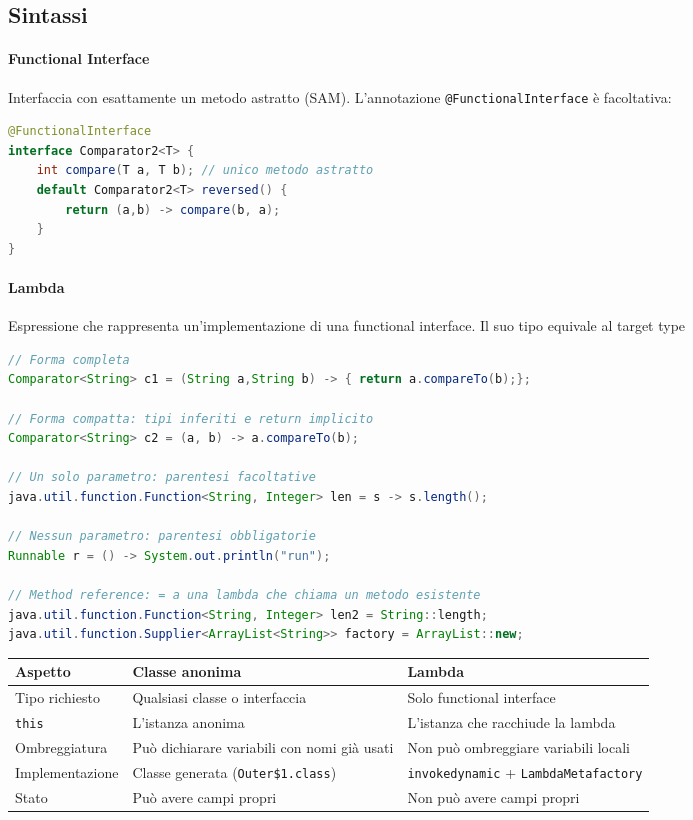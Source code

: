 \documentclass[12pt]{extarticle}
\begin{document}
\subsection{Sintassi}
\paragraph{Functional Interface} Interfaccia con esattamente un metodo astratto (SAM). L'annotazione \texttt{@FunctionalInterface} è facoltativa:
\begin{lstlisting}[language=Java]
@FunctionalInterface
interface Comparator2<T> {
    int compare(T a, T b); // unico metodo astratto
    default Comparator2<T> reversed() {
        return (a,b) -> compare(b, a);
    }
}
\end{lstlisting}

\paragraph{Lambda} Espressione che rappresenta un'implementazione di una functional interface. Il suo tipo equivale al target type
\begin{lstlisting}[language=Java]
// Forma completa
Comparator<String> c1 = (String a,String b) -> { return a.compareTo(b);};

// Forma compatta: tipi inferiti e return implicito
Comparator<String> c2 = (a, b) -> a.compareTo(b);

// Un solo parametro: parentesi facoltative
java.util.function.Function<String, Integer> len = s -> s.length();

// Nessun parametro: parentesi obbligatorie
Runnable r = () -> System.out.println("run");

// Method reference: = a una lambda che chiama un metodo esistente
java.util.function.Function<String, Integer> len2 = String::length;
java.util.function.Supplier<ArrayList<String>> factory = ArrayList::new;
\end{lstlisting}

\begin{center}
\small
\begin{tabular}{p{3.4cm}p{5.2cm}p{5.4cm}}
    \toprule
    \textbf{Aspetto} & \textbf{Classe anonima} & \textbf{Lambda} \\
    \midrule
    Tipo richiesto & Qualsiasi classe o interfaccia & Solo functional interface \\
    \addlinespace
    \texttt{this} & L'istanza anonima & L'istanza che racchiude la lambda \\
    \addlinespace
    Ombreggiatura & Può dichiarare variabili con nomi già usati & Non può ombreggiare variabili locali \\
    \addlinespace
    Implementazione & Classe generata (\texttt{Outer\$1.class}) & \texttt{invokedynamic} + \texttt{LambdaMetafactory} \\
    \addlinespace
    Stato & Può avere campi propri & Non può avere campi propri \\
    \bottomrule
\end{tabular}
\end{center}
\end{document}
